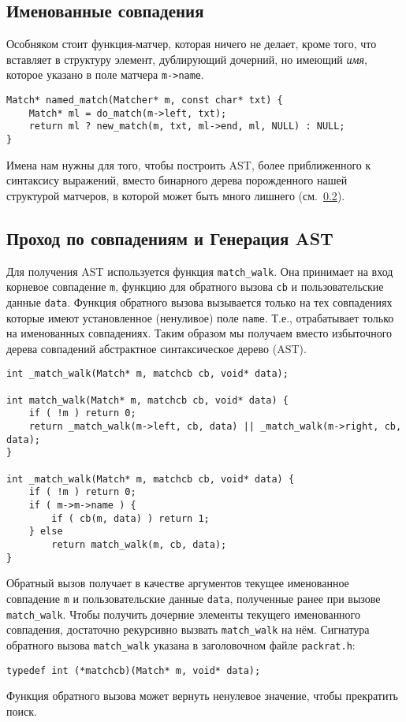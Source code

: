 \documentclass[10pt]{report}
\begin{document}
\subsection{Именованные совпадения}
Особняком стоит функция-матчер, которая ничего не делает, кроме того, что вставляет в структуру элемент, дублирующий дочерний, но  имеющий {\em имя}, которое указано в поле матчера {\tt m->name}. 
\begin{lstlisting}[firstnumber=135]
Match* named_match(Matcher* m, const char* txt) {
	Match* ml = do_match(m->left, txt);
	return ml ? new_match(m, txt, ml->end, ml, NULL) : NULL;
}
\end{lstlisting}
Имена нам нужны для того, чтобы построить AST, более приближенного к синтаксису выражений, вместо бинарного дерева порожденного нашей структурой матчеров, в которой может быть много лишнего (см.~\ref{sec:match-walk}).
\subsection{Проход по совпадениям и Генерация AST}
\label{sec:match-walk}
Для получения AST используется функция {\tt match\_walk}. 
Она принимает на вход корневое совпадение {\tt m}, функцию для обратного вызова {\tt cb} и пользовательские данные {\tt data}. 
Функция обратного вызова вызывается только на тех совпадениях которые имеют установленное (ненуливое) поле {\tt name}. Т.е., отрабатывает только на именованных совпадениях. 
Таким образом мы получаем вместо избыточного дерева совпадений абстрактное синтаксическое дерево (AST). 
\begin{lstlisting}[firstnumber=205, caption=packrat.c -- Функция обхода синтаксического дерева,label=lst:match-walk]
int _match_walk(Match* m, matchcb cb, void* data);

int match_walk(Match* m, matchcb cb, void* data) {
	if ( !m ) return 0;
	return _match_walk(m->left, cb, data) || _match_walk(m->right, cb, data);
}

int _match_walk(Match* m, matchcb cb, void* data) {
	if ( !m ) return 0;
	if ( m->m->name ) { 
		if ( cb(m, data) ) return 1;
	} else
		return match_walk(m, cb, data);
}
\end{lstlisting}
Обратный вызов получает в качестве аргументов текущее именованное совпадение {\tt m} и пользовательские данные {\tt data}, полученные ранее при вызове {\tt match\_walk}.
Чтобы получить дочерние элементы текущего именованного совпадения, достаточно рекурсивно вызвать {\tt match\_walk} на нём. Сигнатура обратного вызова {\tt match\_walk} указана в заголовочном файле {\tt packrat.h}: 
\begin{lstlisting}[firstnumber=37]
typedef int (*matchcb)(Match* m, void* data);
\end{lstlisting}
Функция обратного вызова может вернуть ненулевое значение, чтобы прекратить поиск.
\end{document}
